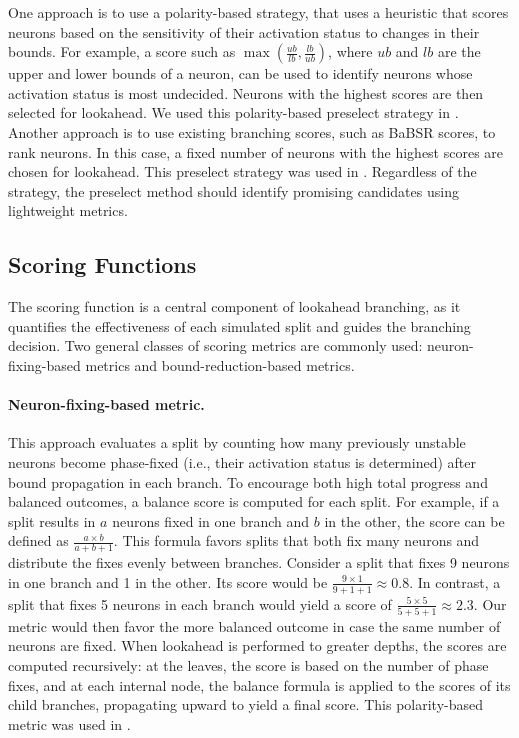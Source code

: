 \documentclass{article}
\begin{document}
One approach is to use a polarity-based strategy, that uses a heuristic that scores neurons based on the sensitivity of their activation status to changes in their bounds. For example, a score such as $\max\left(\frac{ub}{lb}, \frac{lb}{ub}\right)$, where $ub$ and $lb$ are the upper and lower bounds of a neuron, can be used to identify neurons whose activation status is most undecided. Neurons with the highest scores are then selected for lookahead. We used this polarity-based preselect strategy in \marabou. Another approach is to use existing branching scores, such as BaBSR scores, to rank neurons. In this case, a fixed number of neurons with the highest scores are chosen for lookahead. This preselect strategy was used in \abcrown. Regardless of the strategy, the preselect method should identify promising candidates using lightweight metrics.

\subsection{Scoring Functions}
\label{subsec:scoring}

The scoring function is a central component of lookahead branching, as it quantifies the effectiveness of each simulated split and guides the branching decision. Two general classes of scoring metrics are commonly used: neuron-fixing-based metrics and bound-reduction-based metrics.

\paragraph{Neuron-fixing-based metric.}
This approach evaluates a split by counting how many previously unstable neurons become phase-fixed (i.e., their activation status is determined) after bound propagation in each branch. To encourage both high total progress and balanced outcomes, a balance score is computed for each split. For example, if a split results in $a$ neurons fixed in one branch and $b$ in the other, the score can be defined as $\frac{a \times b}{a + b + 1}$. This formula favors splits that both fix many neurons and distribute the fixes evenly between branches. Consider a split that fixes 9 neurons in one branch and 1 in the other. Its score would be $\frac{9 \times 1}{9 + 1 + 1} \approx 0.8$. In contrast, a split that fixes 5 neurons in each branch would yield a score of $\frac{5 \times 5}{5 + 5 + 1} \approx 2.3$. Our metric would then favor the more balanced outcome in case the same number of neurons are fixed. When lookahead is performed to greater depths, the scores are computed recursively: at the leaves, the score is based on the number of phase fixes, and at each internal node, the balance formula is applied to the scores of its child branches, propagating upward to yield a final score. This polarity-based metric was used in \marabou.
\end{document}
